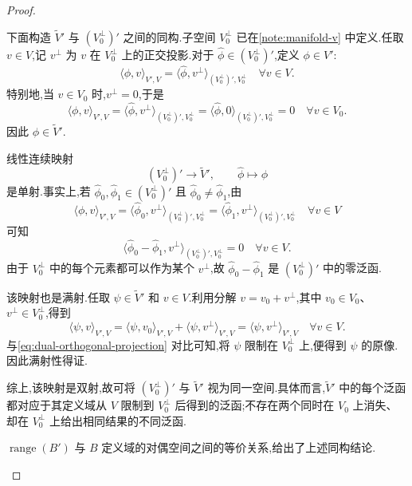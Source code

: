 \begin{proof}
\begin{enumerate}
  下面构造 $\widetilde{V}'$ 与 $(V_0^{\perp})'$ 之间的同构.子空间 $V_0^{\perp}$ 已在\cref{note:manifold-v} 中定义.任取 $v\in V$,记 $v^{\perp}$ 为 $v$ 在 $V_0^{\perp}$ 上的正交投影.对于 $\widehat{\phi}\in(V_0^{\perp})'$,定义 $\phi\in V'$:
  \begin{equation}\label{eq:dual-orthogonal-projection}
    \langle\phi,v\rangle_{V',V}
      =\langle\widehat{\phi},v^{\perp}\rangle_{(V_0^{\perp})',V_0^{\perp}}
      \quad\forall v\in V.
  \end{equation}
  特别地,当 $v\in V_0$ 时,$v^{\perp}=0$,于是
  \[
    \langle\phi,v\rangle_{V',V}
      =\langle\widehat{\phi},v^{\perp}\rangle_{(V_0^{\perp})',V_0^{\perp}}
      =\langle\widehat{\phi},0\rangle_{(V_0^{\perp})',V_0^{\perp}}=0
      \quad\forall v\in V_0.
  \]
  因此 $\phi\in\widetilde{V}'$.

  线性连续映射
  \[
    (V_0^{\perp})'\longrightarrow\widetilde{V}',
    \qquad\widehat{\phi}\longmapsto\phi
  \]
  是单射.事实上,若 $\widehat{\phi}_0,\widehat{\phi}_1\in(V_0^{\perp})'$ 且 $\widehat{\phi}_0\ne\widehat{\phi}_1$,由
  \[
    \langle\phi,v\rangle_{V',V}
      =\langle\widehat{\phi}_0,v^{\perp}\rangle_{(V_0^{\perp})',V_0^{\perp}}
      =\langle\widehat{\phi}_1,v^{\perp}\rangle_{(V_0^{\perp})',V_0^{\perp}}
      \quad\forall v\in V
  \]
  可知
  \[
    \langle\widehat{\phi}_0-\widehat{\phi}_1,v^{\perp}\rangle_{(V_0^{\perp})',V_0^{\perp}}=0
    \quad\forall v\in V.
  \]
  由于 $V_0^{\perp}$ 中的每个元素都可以作为某个 $v^{\perp}$,故 $\widehat{\phi}_0-\widehat{\phi}_1$ 是 $(V_0^{\perp})'$ 中的零泛函.

  该映射也是满射.任取 $\psi\in\widetilde{V}'$ 和 $v\in V$.利用分解 $v=v_0+v^{\perp}$,其中 $v_0\in V_0$、$v^{\perp}\in V_0^{\perp}$,得到
  \[
    \langle\psi,v\rangle_{V',V}
      =\langle\psi,v_0\rangle_{V',V}+\langle\psi,v^{\perp}\rangle_{V',V}
      =\langle\psi,v^{\perp}\rangle_{V',V}
      \quad\forall v\in V.
  \]
  与\cref{eq:dual-orthogonal-projection} 对比可知,将 $\psi$ 限制在 $V_0^{\perp}$ 上,便得到 $\psi$ 的原像.因此满射性得证.

  综上,该映射是双射,故可将 $(V_0^{\perp})'$ 与 $\widetilde{V}'$ 视为同一空间.具体而言,$\widetilde{V}'$ 中的每个泛函都对应于其定义域从 $V$ 限制到 $V_0^{\perp}$ 后得到的泛函;不存在两个同时在 $V_0$ 上消失、却在 $V_0^{\perp}$ 上给出相同结果的不同泛函.

  $\operatorname{range}(B')$ 与 $B$ 定义域的对偶空间之间的等价关系,给出了上述同构结论.


\end{enumerate}
\end{proof}
